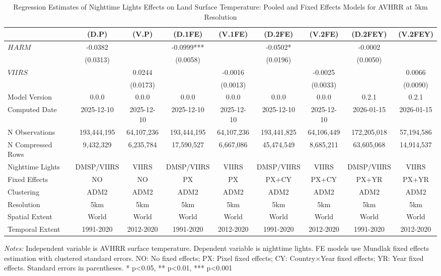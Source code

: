 \begin{table}[htbp]
\centering
\footnotesize
\caption{Regression Estimates of Nighttime Lights Effects on Land Surface Temperature: Pooled and Fixed Effects Models for AVHRR at 5km Resolution}
\begin{tabular}{lcccccccc}
\toprule
 & (D.P) & (V.P) & (D.1FE) & (V.1FE) & (D.2FE) & (V.2FE) & (D.2FEY) & (V.2FEY) \\
\midrule
$HARM$ & -0.0382 &  & -0.0999*** &  & -0.0502* &  & -0.0002 &  \\
 & (0.0313) &  & (0.0058) &  & (0.0196) &  & (0.0050) &  \\
$VIIRS$ &  & 0.0244 &  & -0.0016 &  & -0.0025 &  & 0.0066 \\
 &  & (0.0173) &  & (0.0013) &  & (0.0033) &  & (0.0090) \\
\midrule
Model Version & 0.0.0 & 0.0.0 & 0.0.0 & 0.0.0 & 0.0.0 & 0.0.0 & 0.2.1 & 0.2.1 \\
Computed Date & 2025-12-10 & 2025-12-10 & 2025-12-10 & 2025-12-10 & 2025-12-10 & 2025-12-10 & 2026-01-15 & 2026-01-15 \\
N Observations & 193,444,195 & 64,107,236 & 193,444,195 & 64,107,236 & 193,441,825 & 64,106,449 & 172,205,018 & 57,194,586 \\
N Compressed Rows & 9,432,329 & 6,235,784 & 17,590,527 & 6,667,086 & 45,474,549 & 8,685,211 & 63,605,068 & 14,914,537 \\
\midrule
Nighttime Lights & DMSP/VIIRS & VIIRS & DMSP/VIIRS & VIIRS & DMSP/VIIRS & VIIRS & DMSP/VIIRS & VIIRS \\
Fixed Effects & NO & NO & PX & PX & PX+CY & PX+CY & PX+YR & PX+YR \\
Clustering & ADM2 & ADM2 & ADM2 & ADM2 & ADM2 & ADM2 & ADM2 & ADM2 \\
\cmidrule(lr){1-9}
Resolution & 5km & 5km & 5km & 5km & 5km & 5km & 5km & 5km \\
Spatial Extent & World & World & World & World & World & World & World & World \\
Temporal Extent & 1991-2020 & 2012-2020 & 1991-2020 & 2012-2020 & 1991-2020 & 2012-2020 & 1991-2020 & 2012-2020 \\
\bottomrule
\end{tabular}
\begin{threeparttable}
\begin{tablenotes}\small
\item \textit{Notes:} Independent variable is AVHRR surface temperature. Dependent variable is nighttime lights. FE models use Mundlak fixed effects estimation with clustered standard errors. NO: No fixed effects; PX: Pixel fixed effects; CY: Country×Year fixed effects; YR: Year fixed effects. Standard errors in parentheses. * p<0.05, ** p<0.01, *** p<0.001
\end{tablenotes}
\end{threeparttable}
\end{table}